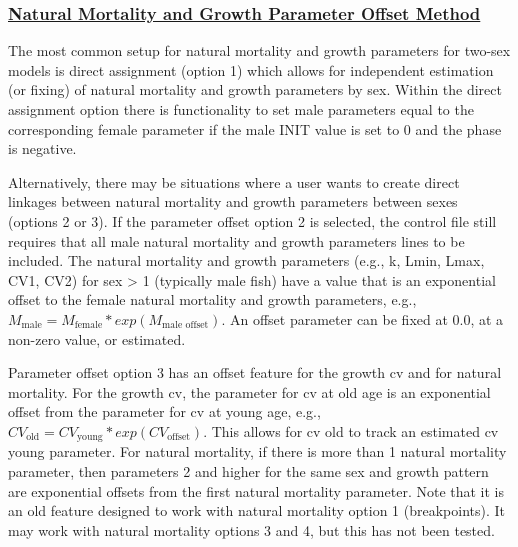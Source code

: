\hypertarget{offset}{}
\subsubsection[Natural Mortality and Growth Parameter Offset Method]{\protect\hyperlink{offset}{Natural Mortality and Growth Parameter Offset Method}}

The most common setup for natural mortality and growth parameters for two-sex models is direct assignment (option 1) which allows for independent estimation (or fixing) of natural mortality and growth parameters by sex. Within the direct assignment option there is functionality to set male parameters equal to the corresponding female parameter if the male INIT value is set to 0 and the phase is negative. 

Alternatively, there may be situations where a user wants to create direct linkages between natural mortality and growth parameters between sexes (options 2 or 3). If the parameter offset option 2 is selected, the control file still requires that all male natural mortality and growth parameters lines to be included. The natural mortality and growth parameters (e.g., k, Lmin, Lmax, CV1, CV2) for sex > 1 (typically male fish) have a value that is an exponential offset to the female natural mortality and growth parameters, e.g., $M_{\text{male}} = M_{\text{female}}*exp(M_{\text{male offset}})$. An offset parameter can be fixed at 0.0, at a non-zero value, or estimated.

Parameter offset option 3 has an offset feature for the growth \gls{cv} and for natural mortality. For the growth \gls{cv}, the parameter for \gls{cv} at old age is an exponential offset from the parameter for \gls{cv} at young age, e.g., $CV_{\text{old}} = CV_{\text{young}}*exp(CV_{\text{offset}})$. This allows for \gls{cv} old to track an estimated \gls{cv} young parameter. For natural mortality, if there is more than 1 natural mortality parameter, then parameters 2 and higher for the same sex and growth pattern are exponential offsets from the first natural mortality parameter. Note that it is an old feature designed to work with natural mortality option 1 (breakpoints). It may work with natural mortality options 3 and 4, but this has not been tested.


